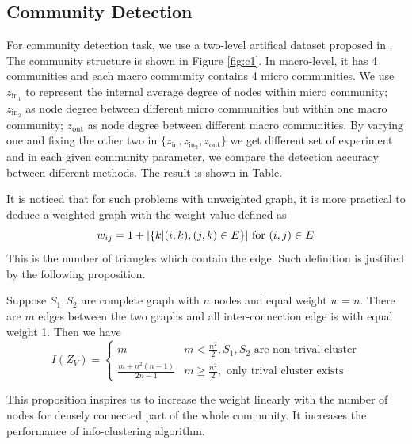 \documentclass{article}
\begin{document}
\subsection{Community Detection}
For community detection task, we use a two-level artifical dataset proposed in \cite{RN22}. 
The community structure is shown in Figure \ref{fig:c1}. In macro-level, it has 4 communities and each macro community contains 4 micro communities. We use $z_{\mathrm{in}_1}$ to represent the internal average degree of nodes within micro community; $z_{\mathrm{in}_2}$ as node degree between different micro communities but within one macro community; $z_{\mathrm{out}}$ as node degree between different macro communities. By varying one and fixing the other two in $\{z_{\mathrm{in}} , z_{\mathrm{in}_2}, z_{\mathrm{out}} \}$ we get different set of experiment and in each given community parameter, we compare the detection accuracy between different methods. The result is shown in Table.

It is noticed that for such problems with unweighted graph, it is more practical to deduce a weighted graph with the weight value defined as 
\begin{equation}
    w_{ij} = 1 + \lvert\{k | (i,k),(j,k) \in E \}\rvert \textrm{ for } (i,j) \in E
\end{equation}
This is the number of triangles which contain the edge. Such definition is justified by the following proposition.
\begin{proposition}
Suppose $S_1, S_2 $ are complete graph with $n$ nodes and equal weight $w=n$. There are $m$ edges between the two graphs and all inter-connection edge is with equal weight 1. Then we have
\begin{equation}
I(Z_V) = \begin{cases}
m & m <\frac{n^2}{2}, S_1,S_2 \textrm{ are non-trival cluster} \\
\frac{m+n^2(n-1)}{2n-1} & m\geq \frac{n^2}{2}, \textrm{ only trival cluster exists} 
\end{cases}
\end{equation}
\end{proposition}
This proposition inspires us to increase the weight linearly with the number of nodes for densely connected part of the whole community. It increases the performance of info-clustering algorithm.
\end{document}
